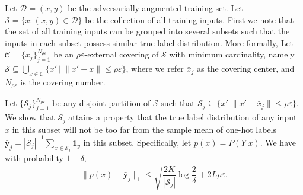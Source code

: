 

Let $\mathcal{D} = (x, y)$ be the adversarially augmented training set. Let $\mathcal{S} = \{x: (x,y)\in \mathcal{D}\}$ be the collection of all training inputs.
First we note that the set of all training inputs can be grouped into several subsets such that the inputs in each subset possess similar true label distribution. 
More formally, 
Let $\mathcal{C} = \{\bar{x}_j\}_{j=1}^{N_{\rho\varepsilon}}$ be an $\rho\varepsilon$-external covering of $\mathcal{S}$ with minimum cardinality, namely $\mathcal{S} \subseteq \bigcup_{x \in \mathcal{C}} \{x' ~|~ \|x ' - x\| \le \rho\varepsilon \}$,
where we refer $\bar{x}_j$ as the covering center, and $N_{\rho\varepsilon}$ is the covering number.

Let $\{\mathcal{S}_j\}_{j=1}^{N_{\rho\varepsilon}}$ be any disjoint partition of $\mathcal{S}$ such that $\mathcal{S}_j \subseteq \{x' | \|x ' - \bar{x}_j\| \le \rho\varepsilon \}$. 
We show that $\mathcal{{S}}_j$ attains a property that the true label distribution of any input $x$ in this subset will not be too far from the sample mean of one-hot labels $\mathbf{\bar{y}}_j = {|\mathcal{{S}}_j|}^{-1} \sum_{x\in \mathcal{{S}}_j} \mathbf{1}_{y}$ in this subset. Specifically, let $p(x) = P(Y|x)$. We have with probability $1 - \delta$,
\begin{equation}
     \label{lemma:sample-mean-relax}
    \| p(x) - \bar{\mathbf{y}}_j \|_1 \le \sqrt{\frac{2K}{|\mathcal{{S}}_j|}\log\frac{2}{\delta}} + 2L\rho\varepsilon.
\end{equation}

